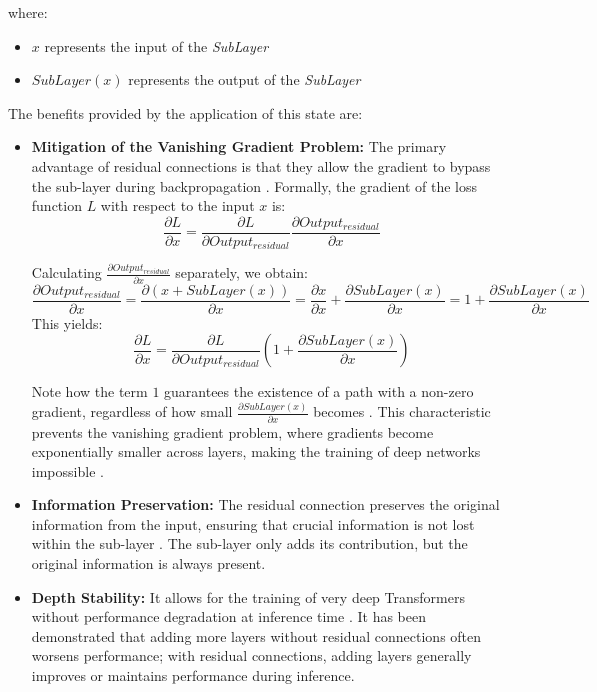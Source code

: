 where:
\begin{itemize}
\item $x$ represents the input of the \textit{SubLayer}
\item $SubLayer(x)$ represents the output of the \textit{SubLayer}
\end{itemize}
The benefits provided by the application of this state are:
\begin{itemize}
\item \textbf{Mitigation of the Vanishing Gradient Problem:} The primary advantage of residual connections is that they allow the gradient to bypass the sub-layer during backpropagation \cite{arxiv-skipconnection-survey}. Formally, the gradient of the loss function $L$ with respect to the input $x$ is:
\begin{equation}
\frac{\partial L}{\partial x} = \frac{\partial L}{\partial Output_{residual}} \frac{\partial Output_{residual}}{\partial x}
\end{equation}

Calculating $\frac{\partial Output_{residual}}{\partial x}$ separately, we obtain:
$$
\frac{\partial Output_{residual}}{\partial x} = \frac{\partial \left(x + SubLayer(x)\right)}{\partial x} = \frac{\partial x}{\partial x} + \frac{\partial SubLayer(x)}{\partial x} = 1 + \frac{\partial SubLayer(x)}{\partial x}
$$
This yields:
$$
 \frac{\partial L}{\partial x} = \frac{\partial L}{\partial Output_{residual}} \left( 1 + \frac{\partial SubLayer(x)}{\partial x} \right)
$$

Note how the term $1$ guarantees the existence of a path with a non-zero gradient, regardless of how small $\frac{\partial SubLayer(x)}{\partial x}$ becomes \cite{arxiv-skipconnection-survey}. This characteristic prevents the vanishing gradient problem, where gradients become exponentially smaller across layers, making the training of deep networks impossible \cite{arxiv-attention, arxiv-skipconnection-survey}.

\item \textbf{Information Preservation:} The residual connection preserves the original information from the input, ensuring that crucial information is not lost within the sub-layer \cite{arxiv-skipconnection-survey}. The sub-layer only adds its contribution, but the original information is always present.

\item \textbf{Depth Stability:} It allows for the training of very deep Transformers without performance degradation at inference time \cite{arxiv-attention, arxiv-skipconnection-survey}. It has been demonstrated that adding more layers without residual connections often worsens performance; with residual connections, adding layers generally improves or maintains performance during inference.
\end{itemize}

